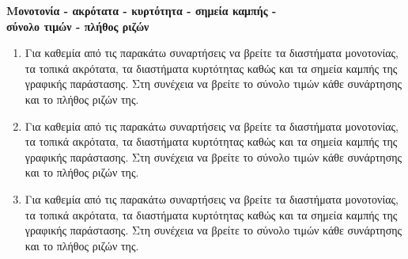 \documentclass[11pt,a4paper]{article}
\begin{document}
\begin{center}
{\Large \textbf{Μονοτονία - ακρότατα - κυρτότητα - σημεία καμπής - \\σύνολο τιμών - πλήθος ριζών}}
\end{center}
\begin{enumerate}
\item Για καθεμία από τις παρακάτω συναρτήσεις να βρείτε τα διαστήματα μονοτονίας, τα τοπικά ακρότατα, τα διαστήματα κυρτότητας καθώς και τα σημεία καμπής της γραφικής παράστασης. Στη συνέχεια να βρείτε το σύνολο τιμών κάθε συνάρτησης και το πλήθος ριζών της.

\item Για καθεμία από τις παρακάτω συναρτήσεις να βρείτε τα διαστήματα μονοτονίας, τα τοπικά ακρότατα, τα διαστήματα κυρτότητας καθώς και τα σημεία καμπής της γραφικής παράστασης. Στη συνέχεια να βρείτε το σύνολο τιμών κάθε συνάρτησης και το πλήθος ριζών της.

\item Για καθεμία από τις παρακάτω συναρτήσεις να βρείτε τα διαστήματα μονοτονίας, τα τοπικά ακρότατα, τα διαστήματα κυρτότητας καθώς και τα σημεία καμπής της γραφικής παράστασης. Στη συνέχεια να βρείτε το σύνολο τιμών κάθε συνάρτησης και το πλήθος ριζών της.

\end{enumerate}
\end{document}
